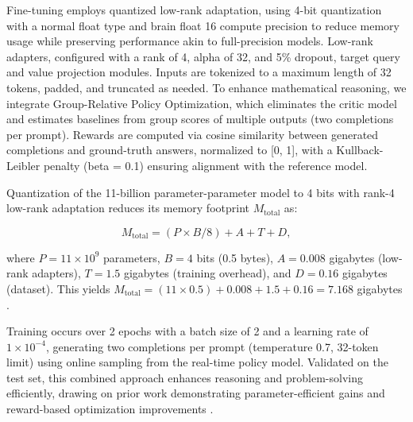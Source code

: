 \documentclass{svproc}
\begin{document}
Fine-tuning employs quantized low-rank adaptation, using 4-bit quantization with a normal float type and brain float 16 compute precision to reduce memory usage while preserving performance akin to full-precision models. Low-rank adapters, configured with a rank of 4, alpha of 32, and 5\% dropout, target query and value projection modules. Inputs are tokenized to a maximum length of 32 tokens, padded, and truncated as needed. To enhance mathematical reasoning, we integrate Group-Relative Policy Optimization, which eliminates the critic model and estimates baselines from group scores of multiple outputs (two completions per prompt). Rewards are computed via cosine similarity between generated completions and ground-truth answers, normalized to [0, 1], with a Kullback-Leibler penalty (beta = 0.1) ensuring alignment with the reference model.

Quantization of the 11-billion parameter-parameter model to 4 bits with rank-4 low-rank adaptation reduces its memory footprint \( M_{\text{total}} \) as:

\begin{equation}
  M_{\text{total}} = (P \times B / 8) + A + T + D,
\end{equation}

\noindent
where \( P = 11 \times 10^9 \) parameters, \( B = 4 \) bits (0.5 bytes), \( A = 0.008 \) gigabytes (low-rank adapters), \( T = 1.5 \) gigabytes (training overhead), and \( D = 0.16 \) gigabytes (dataset). This yields \( M_{\text{total}} = (11 \times 0.5) + 0.008 + 1.5 + 0.16 = 7.168 \) gigabytes \cite{dettmers2023qloraefficientfinetuningquantized}.

Training occurs over 2 epochs with a batch size of 2 and a learning rate of \(1 \times 10^{-4}\), generating two completions per prompt (temperature 0.7, 32-token limit) using online sampling from the real-time policy model. Validated on the test set, this combined approach enhances reasoning and problem-solving efficiently, drawing on prior work demonstrating parameter-efficient gains and reward-based optimization improvements \cite{shao2024deepseekmathpushinglimitsmathematical}.

\end{document}
